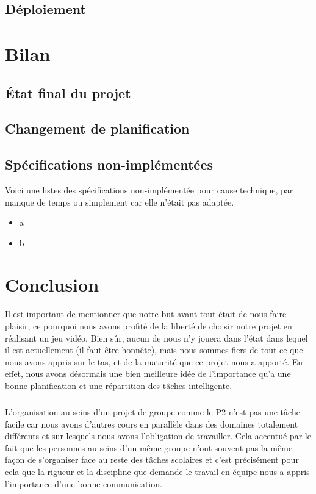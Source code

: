 \documentclass[a4paper,10pt,openany,oneside]{report}
\begin{document}
\section{Déploiement}

\chapter{Bilan}
\thispagestyle{headings}
\section{État final du projet}
\section{Changement de planification}
\section{Spécifications non-implémentées}
Voici une listes des spécifications non-implémentée pour cause technique, par manque de temps ou simplement car elle n'était pas adaptée.
\begin{itemize}
\item a
\item b
\end{itemize}


\chapter{Conclusion}
\thispagestyle{headings}
Il est important de mentionner que notre but avant tout était de nous faire plaisir, ce pourquoi nous avons profité de la liberté de choisir notre projet en réalisant un jeu vidéo. Bien sûr, aucun de nous n'y jouera dans l'état dans lequel il est actuellement (il faut être honnête), mais nous sommes fiers de tout ce que nous avons appris sur le tas, et de la maturité que ce projet nous a apporté. En effet, nous avons désormais une bien meilleure idée de l'importance qu'a une bonne planification et une répartition des tâches intelligente.
\paragraph{}
L'organisation au seins d'un projet de groupe comme le P2 n'est pas une tâche facile car nous avons d'autres cours en parallèle dans des domaines totalement différents et sur lesquels nous avons l'obligation de travailler. Cela accentué par le fait que les personnes au seins d'un même groupe n'ont souvent pas la même façon de s'organiser face au reste des tâches scolaires et c'est précisément pour cela que la rigueur et la discipline que demande le travail en équipe nous a appris l'importance d'une bonne communication. 
\end{document}

